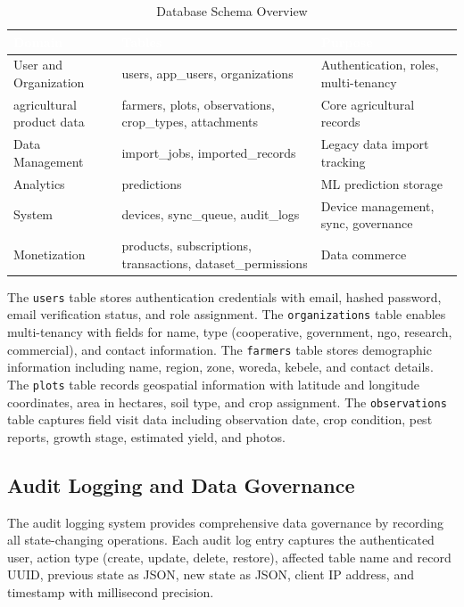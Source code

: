 \documentclass[12pt,a4paper,oneside]{report}
\begin{document}
\begin{table}[H]
\centering
\caption{Database Schema Overview}
\label{tab:database-schema}
\renewcommand{\arraystretch}{1.4}
\begin{tabularx}{\textwidth}{XXl}
\toprule
\rowcolor{headerblue}
\textcolor{white}{\textbf{Domain}} & \textcolor{white}{\textbf{Tables}} & \textcolor{white}{\textbf{Purpose}} \\
\midrule
User and Organization & users, app\_users, organizations & Authentication, roles, multi-tenancy \\
\rowcolor{rowalt}
agricultural product data & farmers, plots, observations, crop\_types, attachments & Core agricultural records \\
Data Management & import\_jobs, imported\_records & Legacy data import tracking \\
\rowcolor{rowalt}
Analytics & predictions & ML prediction storage \\
System & devices, sync\_queue, audit\_logs & Device management, sync, governance \\
\rowcolor{rowalt}
Monetization & products, subscriptions, transactions, dataset\_permissions & Data commerce \\
\bottomrule
\end{tabularx}
\end{table}

The \texttt{users} table stores authentication credentials with email, hashed password, email verification status, and role assignment. The \texttt{organizations} table enables multi-tenancy with fields for name, type (cooperative, government, ngo, research, commercial), and contact information. The \texttt{farmers} table stores demographic information including name, region, zone, woreda, kebele, and contact details. The \texttt{plots} table records geospatial information with latitude and longitude coordinates, area in hectares, soil type, and crop assignment. The \texttt{observations} table captures field visit data including observation date, crop condition, pest reports, growth stage, estimated yield, and photos.

\subsection{Audit Logging and Data Governance}
The audit logging system provides comprehensive data governance by recording all state-changing operations. Each audit log entry captures the authenticated user, action type (create, update, delete, restore), affected table name and record UUID, previous state as JSON, new state as JSON, client IP address, and timestamp with millisecond precision.
\end{document}
